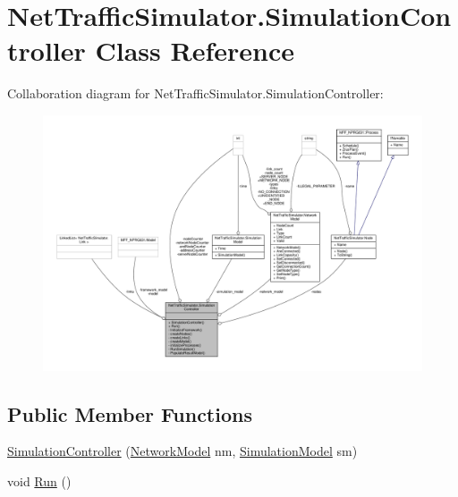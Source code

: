 \hypertarget{classNetTrafficSimulator_1_1SimulationController}{\section{Net\-Traffic\-Simulator.\-Simulation\-Controller Class Reference}
\label{classNetTrafficSimulator_1_1SimulationController}
}


Collaboration diagram for Net\-Traffic\-Simulator.\-Simulation\-Controller\-:\nopagebreak
\begin{figure}[H]
\begin{center}
\leavevmode
\includegraphics[width=350pt]{classNetTrafficSimulator_1_1SimulationController__coll__graph}
\end{center}
\end{figure}
\subsection*{Public Member Functions}
\begin{DoxyCompactItemize}
\item 
\hyperlink{classNetTrafficSimulator_1_1SimulationController_a30890df3e3b1ce4cef47fe597afa58f2}{Simulation\-Controller} (\hyperlink{classNetTrafficSimulator_1_1NetworkModel}{Network\-Model} nm, \hyperlink{classNetTrafficSimulator_1_1SimulationModel}{Simulation\-Model} sm)
\item 
void \hyperlink{classNetTrafficSimulator_1_1SimulationController_a22dedb5c0d0233bfa7acfc858af4a0cf}{Run} ()
\end{DoxyCompactItemize}
